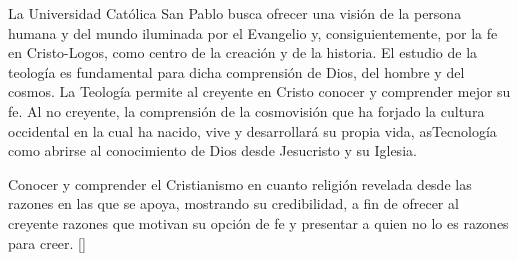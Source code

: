\begin{syllabus}


\begin{justification}
La Universidad Católica San Pablo busca ofrecer una visión de la persona humana y del mundo iluminada por el Evangelio y, consiguientemente, por la fe en Cristo-Logos, como centro de la creación y de la historia. El estudio de la teología es fundamental para dicha comprensión de Dios, del hombre y del cosmos.
La Teología permite al creyente en Cristo conocer y comprender mejor su fe. Al no creyente, la comprensión de la cosmovisión que ha forjado la cultura occidental en la cual ha nacido, vive y desarrollará su propia vida, asTecnología como abrirse al conocimiento de Dios desde Jesucristo y su Iglesia.
\end{justification}

\begin{goals}
\item Conocer y comprender el Cristianismo en cuanto religión revelada desde las razones en las que se apoya, mostrando su credibilidad, a fin de ofrecer al creyente razones que motivan su opción de fe y presentar a quien no lo es razones para creer. [\Familiarity]
\end{goals}

\begin{outcomes}
    \item {}
    \item {}
    \item {}
\end{outcomes}

\begin{competences}
    \item {}
    \item {}
    \item {}
    \item {}
    \item {}
\end{competences}


\end{syllabus}

